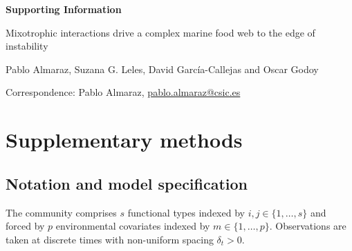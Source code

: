 \documentclass[12pt]{article}
\begin{document}
\begin{center}
{\Large\bfseries Supporting Information}

\vspace{1em}
{\large Mixotrophic interactions drive a complex marine food web to the edge of instability}

\vspace{1em}
Pablo Almaraz, Suzana G. Leles, David Garc\'{i}a-Callejas and Oscar Godoy

\vspace{0.5em}
Correspondence: Pablo Almaraz, \href{mailto:pablo.almaraz@csic.es}{pablo.almaraz@csic.es}
\end{center}

\vspace{1em}

\section{Supplementary methods}

\subsection{Notation and model specification}

The community comprises $s$ functional types indexed by $i,j\in\{1,\ldots,s\}$ and forced by $p$ environmental covariates indexed by $m\in\{1,\ldots,p\}$. Observations are taken at discrete times with non-uniform spacing $\delta_{t}>0$.
\end{document}
